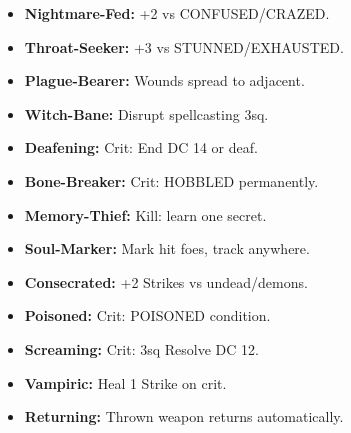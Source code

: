 \documentclass[10pt,twoside]{article}
\begin{document}
\begin{multicols}{2}
\begin{itemize}[leftmargin=0.2cm, itemsep=0.02cm, parsep=0pt]
\item \textcolor{rarecolor}{\textbf{Nightmare-Fed:}} +2 vs CONFUSED/CRAZED.
\item \textcolor{rarecolor}{\textbf{Throat-Seeker:}} +3 vs STUNNED/EXHAUSTED.
\item \textcolor{rarecolor}{\textbf{Plague-Bearer:}} Wounds spread to adjacent.
\item \textcolor{rarecolor}{\textbf{Witch-Bane:}} Disrupt spellcasting 3sq.
\item \textcolor{rarecolor}{\textbf{Deafening:}} Crit: End DC 14 or deaf.
\item \textcolor{rarecolor}{\textbf{Bone-Breaker:}} Crit: HOBBLED permanently.
\item \textcolor{rarecolor}{\textbf{Memory-Thief:}} Kill: learn one secret.
\item \textcolor{rarecolor}{\textbf{Soul-Marker:}} Mark hit foes, track anywhere.
\item \textcolor{rarecolor}{\textbf{Consecrated:}} +2 Strikes vs undead/demons.
\item \textcolor{rarecolor}{\textbf{Poisoned:}} Crit: POISONED condition.
\item \textcolor{rarecolor}{\textbf{Screaming:}} Crit: 3sq Resolve DC 12.
\item \textcolor{rarecolor}{\textbf{Vampiric:}} Heal 1 Strike on crit.
\item \textcolor{rarecolor}{\textbf{Returning:}} Thrown weapon returns automatically.
\end{itemize}

\vspace{0.3cm}


\end{multicols}
\end{document}
